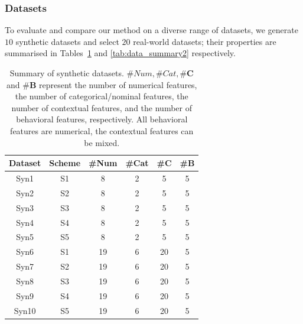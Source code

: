 \documentclass[pdflatex,sn-basic]{sn-jnl}%
\theoremstyle{thmstyleone}%
\theoremstyle{thmstyletwo}%
\theoremstyle{thmstylethree}%
\begin{document}
\subsubsection{Datasets}

To evaluate and compare our method on a diverse range of datasets, we generate $10$ synthetic datasets and select $20$ real-world datasets; their properties are summarised in Tables~\ref{tab:data_summary1} and \ref{tab:data_summary2} respectively. 

\begin{table}[!htbp]
	\caption{Summary of synthetic datasets. $\#Num, \#Cat, \#\mathbf{C}$ and $\#\mathbf{B}$ represent the number of numerical features, the number of categorical/nominal features, the number of contextual features, and the number of behavioral features, respectively. All behavioral features are numerical, the contextual features can be mixed.}
	\centering
	\begin{tabular}{cccccc}
		\toprule
		Dataset  &Scheme & \#Num    & \#Cat  & \#$\mathbf{C}$  & \#$\mathbf{B}$  \\
		\midrule
		Syn1  & S1 & 8 & 2 & 5 & 5  \\
		\midrule
		Syn2  & S2 & 8 & 2  & 5 & 5  \\
		\midrule
		Syn3  & S3 & 8 & 2  & 5 & 5  \\
		\midrule
		Syn4  & S4 & 8 & 2 & 5 & 5  \\
		\midrule
		Syn5  & S5 & 8 & 2  & 5 & 5  \\
		\midrule
		Syn6  & S1 & 19 & 6 & 20 & 5  \\
		\midrule
		Syn7  & S2 & 19 & 6  & 20 & 5  \\
		\midrule
		Syn8  & S3 & 19 & 6  & 20 & 5  \\
		\midrule
		Syn9  & S4 & 19 & 6  & 20 & 5  \\
		\midrule
		Syn10  & S5 & 19 & 6 & 20 & 5  \\
		\bottomrule
	\end{tabular}
	\label{tab:data_summary1}
\end{table}
\end{document}
